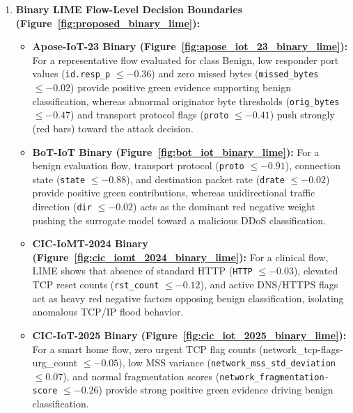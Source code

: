 \documentclass[a4paper,fleqn]{cas-sc}
\begin{document}
\begin{enumerate}
    \item \textbf{Binary LIME Flow-Level Decision Boundaries (Figure~\ref{fig:proposed_binary_lime}):}
    \begin{itemize}
        \item \textbf{Apose-IoT-23 Binary (Figure~\ref{fig:apose_iot_23_binary_lime}):} For a representative flow evaluated for class Benign, low responder port values (\texttt{id.resp\_p} $\le -0.36$) and zero missed bytes (\texttt{missed\_bytes} $\le -0.02$) provide positive green evidence supporting benign classification, whereas abnormal originator byte thresholds (\texttt{orig\_bytes} $\le -0.47$) and transport protocol flags (\texttt{proto} $\le -0.41$) push strongly (red bars) toward the attack decision.
        \item \textbf{BoT-IoT Binary (Figure~\ref{fig:bot_iot_binary_lime}):} For a benign evaluation flow, transport protocol (\texttt{proto} $\le -0.91$), connection state (\texttt{state} $\le -0.88$), and destination packet rate (\texttt{drate} $\le -0.02$) provide positive green contributions, whereas unidirectional traffic direction (\texttt{dir} $\le -0.02$) acts as the dominant red negative weight pushing the surrogate model toward a malicious DDoS classification.
        \item \textbf{CIC-IoMT-2024 Binary (Figure~\ref{fig:cic_iomt_2024_binary_lime}):} For a clinical flow, LIME shows that absence of standard HTTP (\texttt{HTTP} $\le -0.03$), elevated TCP reset counts (\texttt{rst\_count} $\le -0.12$), and active DNS/HTTPS flags act as heavy red negative factors opposing benign classification, isolating anomalous TCP/IP flood behavior.
        \item \textbf{CIC-IoT-2025 Binary (Figure~\ref{fig:cic_iot_2025_binary_lime}):} For a smart home flow, zero urgent TCP flag counts (network\_tcp-flags-urg\_count $\le -0.05$), low MSS variance (\texttt{network\_mss\_std\_deviation} $\le 0.07$), and normal fragmentation scores (\texttt{network\_fragmentation-score} $\le -0.26$) provide strong positive green evidence driving benign classification.
    \end{itemize}


\end{enumerate}
\end{document}
